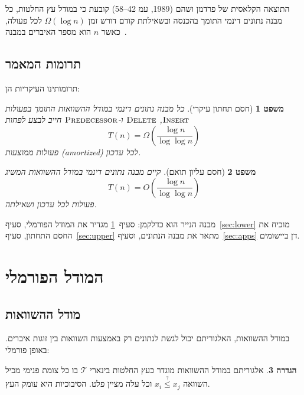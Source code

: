 \documentclass[12pt,a4paper]{article}
\theoremstyle{plain}
\newtheorem{theorem}{משפט}[section]
\theoremstyle{definition}
\newtheorem{definition}[theorem]{הגדרה}
\theoremstyle{remark}
\begin{document}
התוצאה הקלאסית של פרדמן ושהם (1989, עמ 42--58) קובעת כי
במודל עץ החלטות, כל מבנה נתונים דינמי התומך בהכנסה ובשאילתת
קודם דורש זמן $\Omega(\log n)$ לכל פעולה, כאשר $n$ הוא מספר
האיברים במבנה~\citep{fredman1989}.

\subsection{תרומות המאמר}

תרומותינו העיקריות הן:

\begin{theorem}[חסם תחתון עיקרי]
\label{thm:main}
כל מבנה נתונים דינמי במודל ההשוואות התומך בפעולות
$\textsc{Insert}$, $\textsc{Delete}$ ו-$\textsc{Predecessor}$
חייב לבצע לפחות
\begin{equation}
\label{eq:lower_bound}
T(n) = \Omega\!\left(\frac{\log n}{\log \log n}\right)
\end{equation}
פעולות ממוצעות (amortized) לכל עדכון.
\end{theorem}

\begin{theorem}[חסם עליון תואם]
\label{thm:upper}
קיים מבנה נתונים דינמי במודל ההשוואות המשיג
\begin{equation}
\label{eq:upper_bound}
T(n) = O\!\left(\frac{\log n}{\log \log n}\right)
\end{equation}
פעולות לכל עדכון ושאילתה.
\end{theorem}

מבנה הנייר הוא כדלקמן: סעיף~\ref{sec:model} מגדיר את המודל
הפורמלי, סעיף~\ref{sec:lower} מוכיח את החסם התחתון,
סעיף~\ref{sec:upper} מתאר את מבנה הנתונים, וסעיף~\ref{sec:apps}
דן ביישומים.

\section{המודל הפורמלי}
\label{sec:model}

\subsection{מודל ההשוואות}

במודל ההשוואות, האלגוריתם יכול לגשת לנתונים רק באמצעות
השוואות בין זוגות איברים. באופן פורמלי:

\begin{definition}
\label{def:comparison_model}
אלגוריתם במודל ההשוואות מוגדר כעץ החלטות בינארי $\mathcal{T}$
בו כל צומת פנימי מכיל השוואה $x_i \stackrel{?}{\leq} x_j$
וכל עלה מציין פלט. הסיבוכיות היא עומק העץ.
\end{definition}
\end{document}
